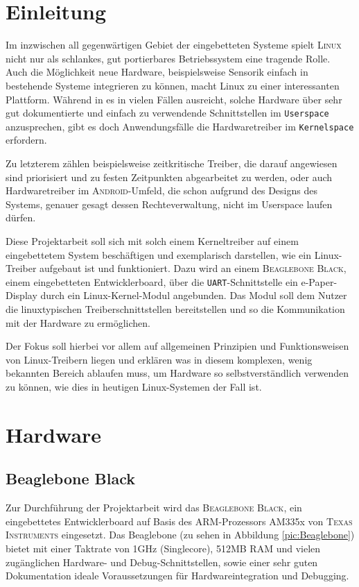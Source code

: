 
\chapter{Einleitung}
Im inzwischen all gegenwärtigen Gebiet der eingebetteten Systeme spielt \textsc{Linux} nicht nur als schlankes, gut portierbares Betriebssystem eine tragende Rolle. Auch die Möglichkeit neue Hardware, beispielsweise Sensorik einfach in bestehende Systeme integrieren zu können, macht Linux zu einer interessanten Plattform. 
Während in es in vielen Fällen ausreicht, solche Hardware über sehr gut dokumentierte und einfach zu verwendende Schnittstellen im \texttt{Userspace} anzusprechen, gibt es doch Anwendungsfälle die Hardwaretreiber im \texttt{Kernelspace} erfordern. 

Zu letzterem zählen beispielsweise zeitkritische Treiber, die darauf angewiesen sind priorisiert und zu festen Zeitpunkten abgearbeitet zu werden, oder auch Hardwaretreiber im \textsc{Android}-Umfeld, die schon aufgrund des Designs des Systems, genauer gesagt dessen Rechteverwaltung, nicht im Userspace laufen dürfen. \newline

Diese Projektarbeit soll sich mit solch einem Kerneltreiber auf einem eingebettetem System beschäftigen und exemplarisch darstellen, wie ein Linux-Treiber aufgebaut ist und funktioniert. Dazu wird an einem \textsc{Beaglebone Black}, einem eingebetteten Entwicklerboard, über die \texttt{UART}-Schnittstelle ein e-Paper-Display durch ein Linux-Kernel-Modul angebunden. Das Modul soll dem Nutzer die linuxtypischen Treiberschnittstellen bereitstellen und so die Kommunikation mit der Hardware zu ermöglichen.

Der Fokus soll hierbei vor allem auf allgemeinen Prinzipien und Funktionsweisen von Linux-Treibern liegen und erklären was in diesem komplexen, wenig bekannten Bereich ablaufen muss, um Hardware so selbstverständlich verwenden zu können, wie dies in heutigen Linux-Systemen der Fall ist. 

\chapter{Hardware}

\section{Beaglebone Black}
Zur Durchführung der Projektarbeit wird das \textsc{Beaglebone Black}, ein eingebettetes Entwicklerboard auf Basis des ARM-Prozessors AM335x von \textsc{Texas Instruments} eingesetzt. Das Beaglebone (zu sehen in Abbildung \ref{pic:Beaglebone}) bietet mit einer Taktrate von 1GHz (Singlecore), 512MB RAM und vielen zugänglichen Hardware- und Debug-Schnittstellen, sowie einer sehr guten Dokumentation ideale Voraussetzungen für Hardwareintegration und Debugging. 

